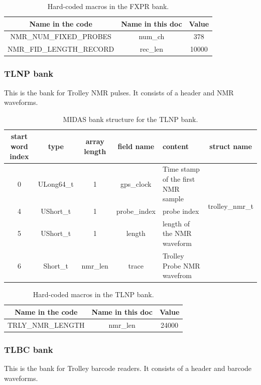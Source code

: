 \begin{table}[htbp]
\centering
\caption{Hard-coded macros in the FXPR bank.}
\begin{tabular}{|c|c|c|}
\hline
Name in the code	& Name in this doc &	Value \\
\hline
NMR\_NUM\_FIXED\_PROBES & num\_ch & 378 \\
\hline
NMR\_FID\_LENGTH\_RECORD & rec\_len & 10000 \\
\hline
\end{tabular} 
\label{tab:fxprmacro}
\end{table}


\subsubsection*{TLNP bank}

This is the bank for Trolley NMR pulses. It consists of a header and NMR waveforms.

\begin{table}[htbp]
\centering
\caption{MIDAS bank structure for the TLNP bank.}
\begin{tabular}{|c|c|c|c|p{4cm}|c|}
\hline
start word index &	type	& array length	&field name	&content	& struct name \\
\hline
0	& ULong64\_t & 1 & gps\_clock & Time stamp of the first NMR sample	& \multirow{3}{*}{trolley\_nmr\_t}   \\ 
\cline{1-5}
4	&UShort\_t	& 1 & probe\_index	&probe index	 & \\ 
\cline{1-5}
5	&UShort\_t	&1 & length&	length of the NMR waveform	 & \\ 
\hline
6	&Short\_t & nmr\_len &	trace	&Trolley Probe NMR wavefrom	 & \\ 
\hline
\end{tabular} 
\label{tab:tlnp}
\end{table}

\begin{table}[htbp]
\centering
\caption{Hard-coded macros in the TLNP bank.}
\begin{tabular}{|c|c|c|}
\hline
Name in the code	& Name in this doc & Value \\
\hline
TRLY\_NMR\_LENGTH	 & nmr\_len & 24000 \\
\hline
\end{tabular} 
\label{tab:tlnpmacro}
\end{table}


\subsubsection*{TLBC bank}
This is the bank for Trolley barcode readers. It consists of a header and barcode waveforms.


